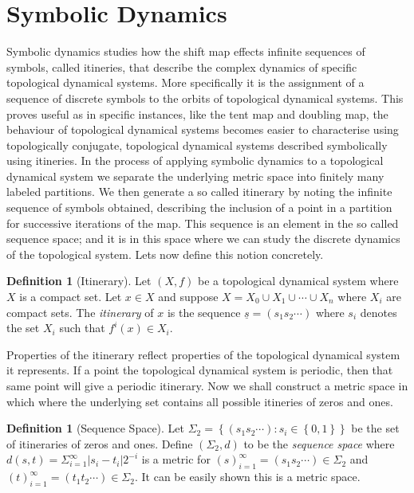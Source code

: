 \documentclass[11pt,a4paper,oneside]{memoir}
\theoremstyle{plain}
\theoremstyle{definition}
\newtheorem{defn}[thm]{Definition}
\begin{document}
\section{Symbolic Dynamics} \label{sec:symbolic-dynamics}
Symbolic dynamics studies how the shift map effects infinite sequences of symbols, called itineries, that describe the complex dynamics of specific topological dynamical systems. More specifically it is the assignment of a sequence of discrete symbols to the orbits of topological dynamical systems. This proves useful as in specific instances, like the tent map and doubling map, the behaviour of topological dynamical systems becomes easier to characterise using topologically conjugate, topological dynamical systems described symbolically using itineries. In the process of applying symbolic dynamics to a topological dynamical system we separate the underlying metric space into finitely many labeled partitions. We then generate a so called itinerary by noting the infinite sequence of symbols obtained, describing the inclusion of a point in a partition for successive iterations of the map. This sequence is an element in the so called sequence space; and it is in this space where we can study the discrete dynamics of the topological system. Lets now define this notion concretely.

\begin{defn}[Itinerary] \label{defn:itinerary}
    Let $(X, f)$ be a topological dynamical system where $X$ is a compact set. Let $x \in X$ and suppose $X = X_0 \cup X_1 \cup \cdots \cup X_n$ where $X_i$ are compact sets. The \emph{itinerary} of $x$ is the sequence $\underline{s} = (s_1s_2\cdots)$ where $s_i$ denotes the set $X_i$ such that $f^i(x) \in X_i$.
\end{defn}

Properties of the itinerary reflect properties of the topological dynamical system it represents. If a point the topological dynamical system is periodic, then that same point will give a periodic itinerary. Now we shall construct a metric space in which where the underlying set contains all possible itineries of zeros and ones.

\begin{defn}[Sequence Space] \label{defn:sequence-space}
    Let $\Sigma_2 = \left\lbrace (s_1s_2\cdots): s_i \in \left\lbrace 0, 1 \right\rbrace \right\rbrace$ be the set of itineraries of zeros and ones. Define $(\Sigma_2, d)$ to be the \emph{sequence space} where $d(s, t) = \Sigma_{i=1}^{\infty}|s_i - t_i|2^{-i}$ is a metric for $(s)_{i=1}^{\infty} = (s_1s_2\cdots) \in \Sigma_2$ and $(t)_{i=1}^{\infty} = (t_1t_2\cdots) \in \Sigma_2$. It can be easily shown this is a metric space.
\end{defn}
\end{document}
